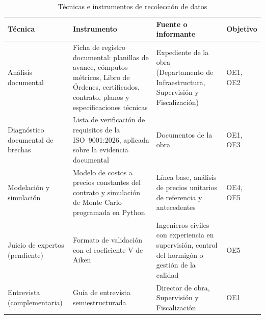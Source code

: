 \begin{table}[H]
\caption{Técnicas e instrumentos de recolección de datos}
\label{tab:tecnicas}
\begin{tabularx}{\linewidth}{@{}P{3.2cm}LP{3.3cm}P{1.7cm}@{}}
\toprule
\textbf{Técnica} & \textbf{Instrumento} & \textbf{Fuente o informante} & \textbf{Objetivo} \\
\midrule
Análisis documental & Ficha de registro documental: planillas de avance, cómputos métricos, Libro de Órdenes, certificados, contrato, planos y especificaciones técnicas & Expediente de la obra (Departamento de Infraestructura, Supervisión y Fiscalización) & OE1, OE2 \\
Diagnóstico documental de brechas & Lista de verificación de requisitos de la ISO~9001:2026, aplicada sobre la evidencia documental & Documentos de la obra & OE1, OE3 \\
Modelación y simulación & Modelo de costos a precios constantes del contrato y simulación de Monte Carlo programada en Python & Línea base, análisis de precios unitarios de referencia y antecedentes & OE4, OE5 \\
Juicio de expertos (pendiente) & Formato de validación con el coeficiente V de Aiken & Ingenieros civiles con experiencia en supervisión, control del hormigón o gestión de la calidad & OE5 \\
Entrevista (complementaria) & Guía de entrevista semiestructurada & Director de obra, Supervisión y Fiscalización & OE1 \\
\bottomrule
\end{tabularx}
\end{table}

